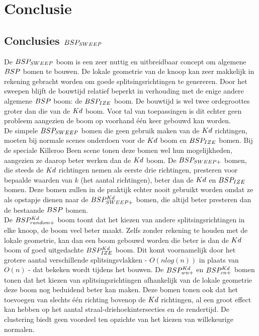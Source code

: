 \chapter{Conclusie}
\label{hoofdstuk:conclusie}

\section{Conclusies $BSP_{SWEEP}$}
De $BSP_{SWEEP}$ boom is een zeer nuttig en uitbreidbaar concept om algemene $BSP$ bomen te bouwen.
De lokale geometrie van de knoop kan zeer makkelijk in rekening gebracht worden om goede splitsingsrichtingen te genereren.
Door het sweepen blijft de bouwtijd relatief beperkt in verhouding met de enige andere algemene $BSP$ boom: de $BSP_{IZE}$ boom.
De bouwtijd is wel twee ordegroottes groter dan die van de $Kd$ boom.
Voor tal van toepassingen is dit echter geen probleem aangezien de boom op voorhand één keer gebouwd kan worden.\\

De simpele $BSP_{SWEEP}$ bomen die geen gebruik maken van de $Kd$ richtingen, moeten bij normale scenes onderdoen voor de $Kd$ boom en $BSP_{IZE}$ bomen.
Bij de speciale Killeroo Been scene tonen deze bomen wel hun mogelijkheden, aangezien ze daarop beter werken dan de $Kd$ boom.
De $BSP_{SWEEP+}$ bomen, die steeds de $Kd$ richtingen nemen als eerste drie richtingen, presteren voor bepaalde waarden van $k$ (het aantal richtingen), beter dan de $Kd$ en $BSP_{IZE}$ bomen.
Deze bomen zullen in de praktijk echter nooit gebruikt worden omdat ze als opstapje dienen naar de $BSP^{Kd}_{SWEEP+}$ bomen, die altijd beter presteren dan de bestaande $BSP$ bomen.\\

De $BSP^{Kd}_{random+}$ boom toont dat het kiezen van andere splitsingsrichtingen in elke knoop, de boom veel beter maakt. 
Zelfs zonder rekening te houden met de lokale geometrie, kan dan een boom gebouwd worden die beter is dan de $Kd$ boom of goed uitgedachte $BSP^{Kd}_{IZE}$ boom. 
Dit komt voornamelijk door het grotere aantal verschillende splitsingsvlakken - $O(nlog(n))$ in plaats van $O(n)$ - dat bekeken wordt tijdens het bouwen.
De $BSP^{Kd}_{wn+}$ en $BSP^{Kd}_{cn+}$ bomen tonen dat het kiezen van splitsingsrichtingen afhankelijk van de lokale geometrie deze boom nog beduidend beter kan maken.
Deze bomen tonen ook dat het toevoegen van slechts één richting bovenop de $Kd$ richtingen, al een groot effect kan hebben op het aantal straal-driehoekintersecties en de rendertijd.
De clustering biedt geen voordeel ten opzichte van het kiezen van willekeurige normalen.

